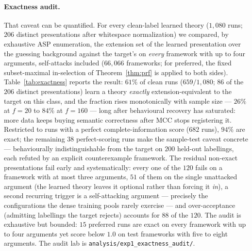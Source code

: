 \documentclass[review,12pt]{elsarticle}
\theoremstyle{definition}
\theoremstyle{remark}
\begin{document}
\paragraph{Exactness audit.} That caveat can be quantified. For every
clean-label learned theory ($1{,}080$ runs; $206$ distinct presentations
after whitespace normalization) we compared, by exhaustive ASP enumeration,
the extension set of the learned presentation over the guessing background
against the target's on \emph{every} framework with up to four arguments,
self-attacks included ($66{,}066$ frameworks; for preferred, the fixed
subset-maximal in-selection of Theorem~\ref{thm:prf} is applied to both
sides). Table~\ref{tab:exactness} reports the result: $61\%$ of clean runs
($659/1{,}080$; $86$ of the $206$ distinct presentations) learn a theory
\emph{exactly} extension-equivalent to the target on this class, and the
fraction rises monotonically with sample size --- $26\%$ at $f{=}20$ to
$84\%$ at $f{=}160$ --- long after behavioural recovery has saturated: more
data keeps buying semantic correctness after MCC stops registering it.
Restricted to runs with a perfect complete-information score ($682$ runs),
$94\%$ are exact; the remaining $38$ perfect-scoring runs make the
sample-test caveat concrete --- behaviourally indistinguishable from the
target on $200$ held-out labellings, each refuted by an explicit
counterexample framework. The residual non-exact presentations fail early and
systematically: every one of the $120$ fails on a framework with at most
three arguments, $51$ of them on the single unattacked argument (the learned
theory leaves it optional rather than forcing it \emph{in}), a second
recurring trigger is a self-attacking argument --- precisely the
configurations the dense training pools rarely exercise --- and
over-acceptance (admitting labellings the target rejects) accounts for $88$
of the $120$. The audit is exhaustive but bounded: $15$ preferred runs are
exact on every framework with up to four arguments yet score below $1.0$ on
test frameworks with five to eight arguments. The audit lab is
\texttt{analysis/exp1\_exactness\_audit/}.
\end{document}
